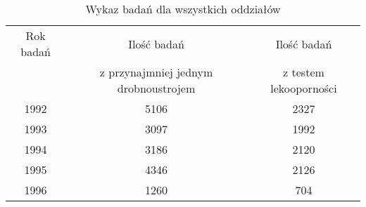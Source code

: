 \documentclass[a4paper,11pt]{article}
\begin{document}
\begin{table}[H]
\begin{center}
\caption{Wykaz badań dla wszystkich oddziałów}
\begin{tabular}{c|c|c}
\hline
Rok badań & Ilość badań & Ilość badań \\
& z przynajmniej jednym drobnoustrojem &z testem lekooporności \\
1992&5106&2327 \\
1993&3097&1992 \\
1994&3186&2120 \\
1995&4346&2126 \\
1996&1260&704 \\
\hline
\end{tabular}
\end{center}
\end{table}
\end{document}
